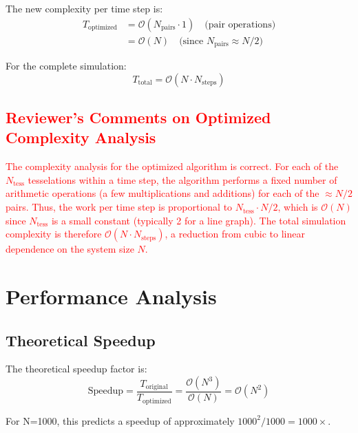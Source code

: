 \documentclass[11pt,a4paper]{article}
\newcommand{\bigO}{\mathcal{O}}
\begin{document}
The new complexity per time step is:
\begin{align}
T_{\text{optimized}} &= \bigO(N_{\text{pairs}} \cdot 1) \quad \text{(pair operations)}\\
&= \bigO(N) \quad \text{(since } N_{\text{pairs}} \approx N/2\text{)}
\end{align}

For the complete simulation:
\begin{equation}
T_{\text{total}} = \bigO(N \cdot N_{\text{steps}})
\end{equation}

\textcolor{red}{
\subsection*{Reviewer's Comments on Optimized Complexity Analysis}
The complexity analysis for the optimized algorithm is correct. For each of the $N_{\text{tess}}$ tesselations within a time step, the algorithm performs a fixed number of arithmetic operations (a few multiplications and additions) for each of the $\approx N/2$ pairs. Thus, the work per time step is proportional to $N_{\text{tess}} \cdot N/2$, which is $\bigO(N)$ since $N_{\text{tess}}$ is a small constant (typically 2 for a line graph). The total simulation complexity is therefore $\bigO(N \cdot N_{\text{steps}})$, a reduction from cubic to linear dependence on the system size $N$.
}

\section{Performance Analysis}

\subsection{Theoretical Speedup}

The theoretical speedup factor is:
\begin{equation}
\text{Speedup} = \frac{T_{\text{original}}}{T_{\text{optimized}}} = \frac{\bigO(N^3)}{\bigO(N)} = \bigO(N^2)
\end{equation}

For N=1000, this predicts a speedup of approximately $1000^2/1000 = 1000\times$.
\end{document}
